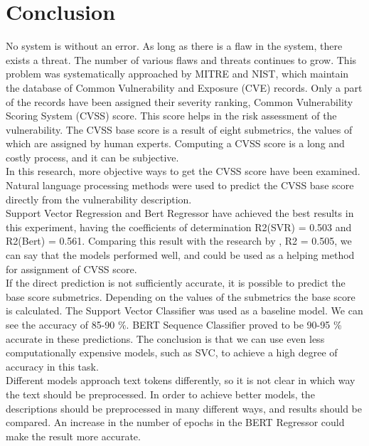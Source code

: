 \documentclass[times, utf8, zavrsni, english]{fer}
\begin{document}
\chapter{Conclusion}
No system is without an error. As long as there is a flaw in the system, there exists a threat. The number of various flaws and threats continues to grow. This problem was systematically approached by MITRE and NIST, which maintain the database of Common Vulnerability and Exposure (CVE) records. Only a part of the records have been assigned their severity ranking, Common Vulnerability Scoring System (CVSS) score. This score helps in the risk assessment of the vulnerability. The CVSS base score is a result of eight submetrics, the values of which are assigned by human experts. Computing a CVSS score is a long and costly process, and it can be subjective. \\

In this research, more objective ways to get the CVSS score have been examined. Natural language processing methods were used to predict the CVSS base score directly from the vulnerability description.\\
Support Vector Regression and Bert Regressor have achieved the best results in this experiment, having the coefficients of determination R2(SVR) = 0.503 and R2(Bert) = 0.561. Comparing this result with the research by \citep{vulnerwatch}, R2 = 0.505, we can say that the models performed well, and could be used as a helping method for assignment of CVSS score. \\
If the direct prediction is not sufficiently accurate, it is possible to predict the base score submetrics. Depending on the values of the submetrics the base score is calculated. The Support Vector Classifier was used as a baseline model. We can see the accuracy of 85-90 \%. BERT Sequence Classifier proved to be 90-95 \% accurate in these predictions. The conclusion is that we can use even less computationally expensive models, such as SVC, to achieve a high degree of accuracy in this task.\\

Different models approach text tokens differently, so it is not clear in which way the text should be preprocessed. 
In order to achieve better models, the descriptions should be preprocessed in many different ways, and results should be compared.
An increase in the number of epochs in the BERT Regressor could make the result more accurate. 



\end{document}
